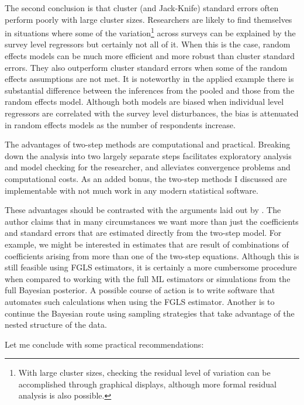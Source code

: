 The second conclusion is that cluster (and Jack-Knife) standard errors often perform poorly with large cluster sizes. Researchers are likely to find themselves in situations where some of the variation\footnote{With large cluster sizes, checking the residual level of variation can be accomplished through graphical displays, although more formal residual analysis is also possible.} across surveys can be explained by the survey level regressors but certainly not all of it. When this is the case, random effects models can be much more efficient and more robust than cluster standard errors. They also outperform cluster standard errors when some of the random effects assumptions are not met. It is noteworthy in the applied example there is substantial difference between the inferences from the pooled and those from the random effects model. Although both models are biased when individual level regressors are correlated with the survey level disturbances, the bias is attenuated in random effects models as the number of respondents increase.

The advantages of two-step methods are computational and practical. Breaking down the analysis into two largely separate steps facilitates exploratory analysis and model checking for the researcher, and alleviates convergence problems and computational costs. As an added bonus, the two-step methods I discussed are implementable with not much work in any modern statistical software.

These advantages should be contrasted with the arguments laid out by \citet{franzese:2005}. The author claims that in many circumstances we want more than just the coefficients and standard errors that are estimated directly from the two-step model. For example, we might be interested in  estimates that are result of  combinations of  coefficients arising from more than one of the two-step equations. Although this is still feasible using FGLS estimators, it is certainly a more cumbersome procedure when compared to working with the full ML estimators or simulations from the full Bayesian posterior.  A possible course of action is to write software that automates such calculations when using the FGLS estimator. Another is to continue the Bayesian route using sampling strategies that take advantage of the nested structure of the data. 

Let me conclude with some practical recommendations:

